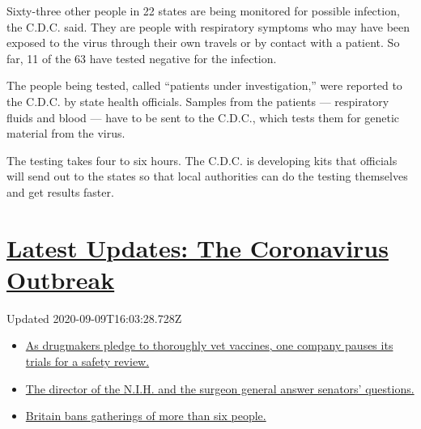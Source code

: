 Sixty-three other people in 22 states are being monitored for possible
infection, the C.D.C. said. They are people with respiratory symptoms
who may have been exposed to the virus through their own travels or by
contact with a patient. So far, 11 of the 63 have tested negative for
the infection.

The people being tested, called ``patients under investigation,'' were
reported to the C.D.C. by state health officials. Samples from the
patients --- respiratory fluids and blood --- have to be sent to the
C.D.C., which tests them for genetic material from the virus.

The testing takes four to six hours. The C.D.C. is developing kits that
officials will send out to the states so that local authorities can do
the testing themselves and get results faster.

\hypertarget{latest-updates-the-coronavirus-outbreak}{%
\section{\texorpdfstring{\href{https://www.nytimes3xbfgragh.onion/2020/09/09/world/covid-19-coronavirus.html?action=click\&pgtype=Article\&state=default\&region=MAIN_CONTENT_1\&context=storylines_live_updates}{Latest
Updates: The Coronavirus
Outbreak}}{Latest Updates: The Coronavirus Outbreak}}\label{latest-updates-the-coronavirus-outbreak}}

Updated 2020-09-09T16:03:28.728Z

\begin{itemize}
\tightlist
\item
  \href{https://www.nytimes3xbfgragh.onion/2020/09/09/world/covid-19-coronavirus.html?action=click\&pgtype=Article\&state=default\&region=MAIN_CONTENT_1\&context=storylines_live_updates\#link-5b0bf0d1}{As
  drugmakers pledge to thoroughly vet vaccines, one company pauses its
  trials for a safety review.}
\item
  \href{https://www.nytimes3xbfgragh.onion/2020/09/09/world/covid-19-coronavirus.html?action=click\&pgtype=Article\&state=default\&region=MAIN_CONTENT_1\&context=storylines_live_updates\#link-6e2052bd}{The
  director of the N.I.H. and the surgeon general answer senators'
  questions.}
\item
  \href{https://www.nytimes3xbfgragh.onion/2020/09/09/world/covid-19-coronavirus.html?action=click\&pgtype=Article\&state=default\&region=MAIN_CONTENT_1\&context=storylines_live_updates\#link-58edc4cb}{Britain
  bans gatherings of more than six people.}
\end{itemize}

